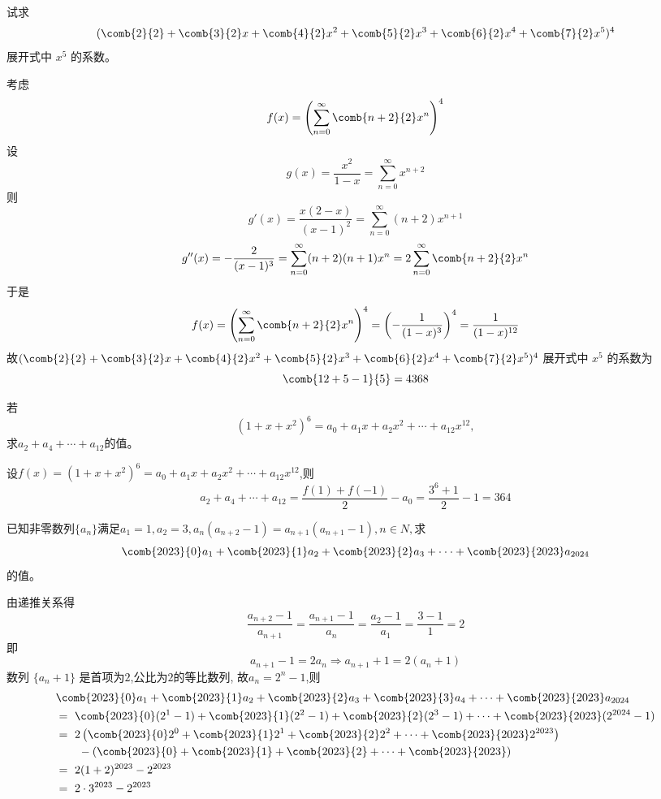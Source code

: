 \begin{questions}
    \question 试求 
    \[
    (\comb{2}{2}+\comb{3}{2}x+\comb{4}{2}x^2+\comb{5}{2}x^3+\comb{6}{2}x^4+\comb{7}{2}x^5)^4
    \] 
    展开式中 \(x^5\) 的系数。
    \begin{solution}
        考虑 
        \[
        f(x) = \left(\sum_{n=0}^\infty \comb{n+2}{2} x^n \right)^4
        \]
        设 
        \[
        g(x)=\frac{x^2}{1-x} = \sum_{n=0}^\infty x^{n+2}
        \]
        则
        \[
        g'(x) = \frac{x(2-x)}{(x-1)^2}= \sum_{n=0}^\infty (n+2)x^{n+1}
        \]
        \[
        g''(x) = -\frac{2}{(x-1)^3}=\sum_{n=0}^\infty (n+2)(n+1)x^n = 2 \sum_{n=0}^\infty \comb{n+2}{2} x^n
        \]
        于是
        \[
        f(x) = \left( \sum_{n=0}^\infty \comb{n+2}{2} x^n \right)^4 = \left(- \frac{1}{(1 - x)^3} \right)^4 = \frac{1}{(1 - x)^{12}}
        \]
        故\((\comb{2}{2}+\comb{3}{2}x+\comb{4}{2}x^2+\comb{5}{2}x^3+\comb{6}{2}x^4+\comb{7}{2}x^5)^4\)  展开式中 \(x^5\) 的系数为
        \[
        \comb{12 + 5 - 1}{5} = 4368
        \]
    \end{solution}

    \question 若 
    \[
    (1 + x + x^2)^6 = a_0 + a_1 x + a_2 x^2 + \cdots + a_{12} x^{12},
    \]
    求\(a_2 + a_4 + \cdots + a_{12}\)的值。
    \begin{solution}
        设$f(x)=(1 + x + x^2)^6 = a_0 + a_1 x + a_2 x^2 + \cdots + a_{12} x^{12}$,则
        \[
        a_2 + a_4 + \cdots + a_{12}=\frac{f(1)+f(-1)}{2}-a_0=\frac{3^6+1}{2}-1=364
        \]
    \end{solution}

    \question 已知非零数列$\{a_n\}$满足$a_{1}=1,a_{2}=3,a_{n}(a_{n+2}-1)=a_{n+1}(a_{n+1}-1),n\in N,$求 
    \[
    \comb{2023}{0}a_{1}+\comb{2023}{1}a_{2}+\comb{2023}{2}a_{3}+\cdot\cdot\cdot+\comb{2023}{2023}a_{2024}
    \]
    的值。
    \begin{solution}
        由递推关系得
        \[
        \frac{a_{n+2}-1}{a_{n+1}} = \frac{a_{n+1}-1}{a_n}= \frac{a_2-1}{a_1} = \frac{3-1}{1} = 2
        \]
        即
        \[
         a_{n+1}-1 = 2a_n \Rightarrow a_{n+1}+1 = 2(a_n+1) 
        \]
        数列 $\{a_n+1\}$ 是首项为$2$,公比为$2$的等比数列, 故$a_n = 2^n - 1$,则
        \begin{align*}
        &\comb{2023}{0}a_{1}+\comb{2023}{1}a_{2}+\comb{2023}{2}a_{3}+\comb{2023}{3}a_{4}+\cdots+\comb{2023}{2023}a_{2024} \\
        &=\ \comb{2023}{0}(2^{1}-1)+\comb{2023}{1}(2^{2}-1)+\comb{2023}{2}(2^{3}-1)+\cdots+\comb{2023}{2023}(2^{2024}-1) \\
        &=\ 2\left(\comb{2023}{0}2^{0}+\comb{2023}{1}2^{1}+\comb{2023}{2}2^{2}+\cdots+\comb{2023}{2023}2^{2023}\right) \\
        &\qquad- \left(\comb{2023}{0}+\comb{2023}{1}+\comb{2023}{2}+\cdots+\comb{2023}{2023}\right) \\
        &=\ 2(1+2)^{2023} - 2^{2023} \\
        &=\ 2 \cdot 3^{2023} - 2^{2023}
        \end{align*}
    \end{solution}


\end{questions}
